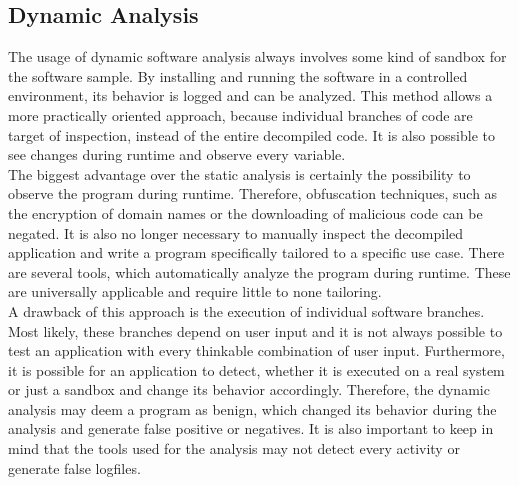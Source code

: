 \subsection{Dynamic Analysis }

The usage of dynamic software analysis always involves some kind of
sandbox for the software sample. By installing and running the software
in a controlled environment, its behavior is logged and can be analyzed.
This method allows a more practically oriented approach, because individual
branches of code are target of inspection, instead of the entire decompiled
code. It is also possible to see changes during runtime and observe
every variable. \\
The biggest advantage over the static analysis is certainly the possibility
to observe the program during runtime. Therefore, obfuscation techniques,
such as the encryption of domain names or the downloading of malicious
code can be negated. It is also no longer necessary to manually inspect
the decompiled application and write a program specifically tailored
to a specific use case. There are several tools, which automatically
analyze the program during runtime. These are universally applicable
and require little to none tailoring.\\
A drawback of this approach is the execution of individual software
branches. Most likely, these branches depend on user input and it
is not always possible to test an application with every thinkable
combination of user input. Furthermore, it is possible for an application
to detect, whether it is executed on a real system or just a sandbox
and change its behavior accordingly. Therefore, the dynamic analysis
may deem a program as benign, which changed its behavior during the
analysis and generate false positive or negatives. It is also important
to keep in mind that the tools used for the analysis may not detect
every activity or generate false logfiles. 


